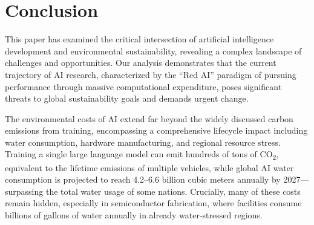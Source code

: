 \documentclass[twoside]{ai_ethics_class}
\begin{document}


\section{Conclusion}

This paper has examined the critical intersection of artificial intelligence development and environmental sustainability, revealing a complex landscape of challenges and opportunities.
Our analysis demonstrates that the current trajectory of AI research, characterized by the ``Red AI'' paradigm of pursuing performance through massive computational expenditure, poses significant threats to global sustainability goals and demands urgent change.

The environmental costs of AI extend far beyond the widely discussed carbon emissions from training, encompassing a comprehensive lifecycle impact including water consumption, hardware manufacturing, and regional resource stress.
Training a single large language model can emit hundreds of tons of CO\textsubscript{2}, equivalent to the lifetime emissions of multiple vehicles, while global AI water consumption is projected to reach 4.2--6.6 billion cubic meters annually by 2027—surpassing the total water usage of some nations.
Crucially, many of these costs remain hidden, especially in semiconductor fabrication, where facilities consume billions of gallons of water annually in already water-stressed regions.
\end{document}
